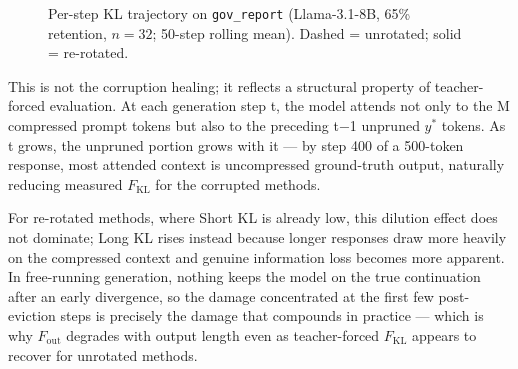 \documentclass[10pt,letterpaper]{article}
\begin{document}
\begin{figure}[H]
\caption{Per-step KL trajectory on \texttt{gov\_report} (Llama-3.1-8B, 65\% retention,
$n=32$; 50-step rolling mean). Dashed = unrotated; solid = re-rotated.}
\label{fig:perstep-kl}
\end{figure}

This is not the corruption healing;
it reflects a structural property of teacher-forced evaluation. At each
generation step t, the model attends not only to the M compressed prompt
tokens but also to the preceding t−1 unpruned \(y^*\) tokens. As t
grows, the unpruned portion grows with it --- by step 400 of a 500-token
response, most attended context is uncompressed ground-truth output,
naturally reducing measured \(F_{\text{KL}}\) for the corrupted methods.

For re-rotated methods, where Short KL is already low, this
dilution effect does not dominate; Long KL rises instead because longer
responses draw more heavily on the compressed context and genuine
information loss becomes more apparent. In free-running generation,
nothing keeps the model on the true continuation after an early
divergence, so the damage concentrated at the first few post-eviction
steps is precisely the damage that compounds in practice --- which is
why \(F_{\text{out}}\) degrades with output length even as
teacher-forced \(F_{\text{KL}}\) appears to recover for unrotated
methods.
\end{document}
